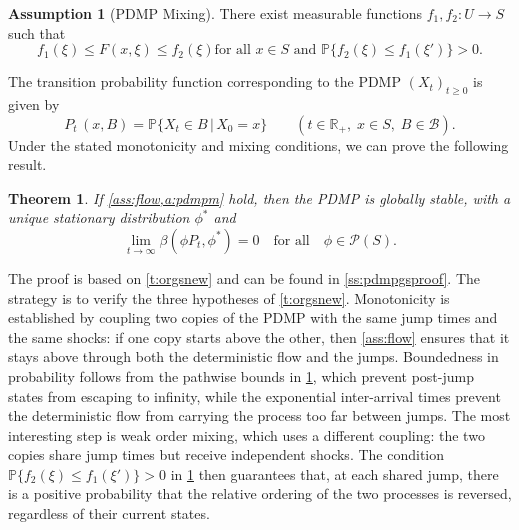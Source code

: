 \documentclass[12pt,reqno]{amsart}
\numberwithin{equation}{section}
\newtheorem{theorem}{Theorem}[section]
\theoremstyle{definition}
\newtheorem{assumption}{Assumption}[section]
\newcommand{\1}{\mathbbm{1}}
\newcommand{\RR}{\mathbb{R}}
\newcommand{\PP}{\mathbb P}
\newcommand{\bB}{\mathscr{B}}
\newcommand{\pP}{\mathscr{P}}
\begin{document}
\begin{assumption}[PDMP Mixing]\label{a:pdmpm}
    There exist measurable functions $f_1,
    f_2 \colon U \to S$ such that
    \begin{equation*}
        \text{
            $f_1(\xi) \leq F(x, \xi) \leq f_2(\xi)$
            for all $x \in S$ and $\PP\{f_2(\xi) \leq f_1(\xi')\} > 0$.
        }
    \end{equation*}
\end{assumption}

The transition probability function corresponding to the PDMP $(X_t)_{t \geq 0}$
is given by 
%
\begin{equation*}
    P_t \,(x, B) = \PP \{ X_t \in B \,|\, X_0 = x\}
    \qquad (t \in \RR_+, \; x \in S, \; B \in \bB).
\end{equation*}
%
Under the stated monotonicity and mixing conditions, we can prove
the following result.  

\begin{theorem}\label{t:pdmpgs}
    If \cref{ass:flow,a:pdmpm} hold, then the PDMP is globally stable, with a
    unique stationary distribution $\phi^*$ and
    \begin{equation}\label{eq:pdmps}
        \lim_{t \to \infty} \beta(\phi P_t, \phi^*) = 0
        \quad \text{for all} \quad \phi \in \pP(S).
    \end{equation}
\end{theorem}

The proof is based on \cref{t:orgsnew} and can be found in
\cref{ss:pdmpgsproof}.  The strategy is to verify the three hypotheses of
\cref{t:orgsnew}.  Monotonicity is established by coupling two copies of the
PDMP with the same jump times and the same shocks: if one copy starts above the
other, then \cref{ass:flow} ensures that it stays above through both the
deterministic flow and the jumps.  Boundedness in probability follows from the
pathwise bounds in \cref{a:pdmpm}, which prevent post-jump states from escaping
to infinity, while the exponential inter-arrival times prevent the deterministic
flow from carrying the process too far between jumps.  The most interesting step
is weak order mixing, which uses a different coupling: the two copies share
jump times but receive independent shocks.  The condition
$\PP\{f_2(\xi) \leq f_1(\xi')\} > 0$ in \cref{a:pdmpm} then guarantees that,
at each shared jump, there is a positive probability that the relative ordering
of the two processes is reversed, regardless of their current states.
\end{document}
